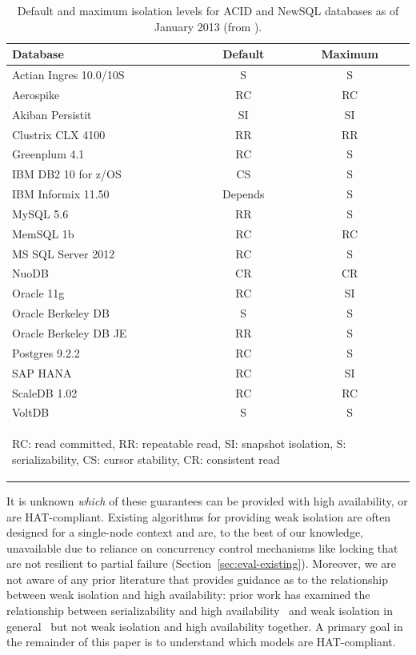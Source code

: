 \begin{table}
\begin{center}
\begin{small}
\begin{tabular}{|l|c|c|}
\hline
Database & Default & Maximum\\\hline
Actian Ingres 10.0/10S & S & S\\
Aerospike & RC & RC\\
Akiban Persistit & SI & SI\\
Clustrix CLX 4100 & RR & RR\\
Greenplum 4.1 & RC & S \\
IBM DB2 10 for z/OS & CS & S\\
IBM Informix 11.50 & Depends & S\\
MySQL 5.6 & RR & S \\
MemSQL 1b & RC & RC\\
MS SQL Server 2012 & RC & S \\
NuoDB & CR & CR\\
Oracle 11g & RC & SI\\
Oracle Berkeley DB & S & S\\
Oracle Berkeley DB JE & RR & S\\
Postgres 9.2.2 & RC & S\\
SAP HANA & RC & SI\\
ScaleDB 1.02 & RC & RC\\
VoltDB & S & S\\
\hline
\multicolumn{3}{|p{7cm}|}{{\begin{small}{RC: read committed, RR: repeatable read, SI: snapshot isolation, S: serializability, CS: cursor stability, CR: consistent read}\end{small}}}\\\hline

\end{tabular}
\caption{Default and maximum isolation levels for ACID and NewSQL
  databases as of January 2013 (from
  \protect\cite{hat-hotos}).}\vspace{-2.5em}
\label{table:existing}
\end{small}
\end{center}
\end{table}

It is unknown \textit{which} of these guarantees can be provided with
high availability, or are HAT-compliant. Existing algorithms for
providing weak isolation are often designed for a single-node context
and are, to the best of our knowledge, unavailable due to reliance
on concurrency control mechanisms like locking that are not resilient
to partial failure (Section~\ref{sec:eval-existing}). Moreover, we are
not aware of any prior literature that provides guidance as to the
relationship between weak isolation and high availability: prior work
has examined the relationship between serializability and high
availability~\cite{davidson-survey} and weak isolation in
general~\cite{adya, ansicritique, gray-isolation} but not weak
isolation and high availability together.  A primary goal in the
remainder of this paper is to understand which models are
HAT-compliant.


